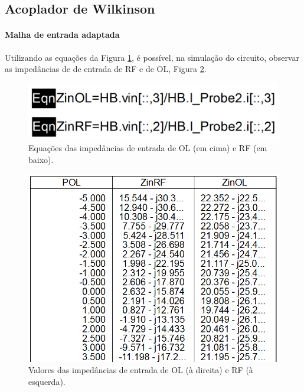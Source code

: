 \documentclass[11pt]{article}
\numberwithin{equation}{section}
\begin{document}
\subsection{Acoplador de Wilkinson}

\paragraph{Malha de entrada adaptada} \hspace{0pt} 

Utilizando as equações da Figura \ref{fig:Eq}, é possível, na simulação do circuito, observar as impedâncias de de entrada de RF e de OL, Figura \ref{fig:Imp_OL_RF}.

\begin{figure}[h]
\centering
\includegraphics[keepaspectratio=true, scale=0.33]{exps/Eq}
\vspace{-0.5em}
\caption{Equações das impedâncias de entrada de OL (em cima) e RF (em baixo).}
\vspace{-0.8em}
\label{fig:Eq}
\end{figure}


\begin{figure}[h]
\centering
\includegraphics[keepaspectratio=true, scale=0.39]{exps/Z_20}
\vspace{-0.5em}
\caption{Valores das impedâncias de entrada de OL (à direita) e RF (à esquerda).}
\vspace{-0.8em}
\label{fig:Imp_OL_RF}
\end{figure}
\end{document}
